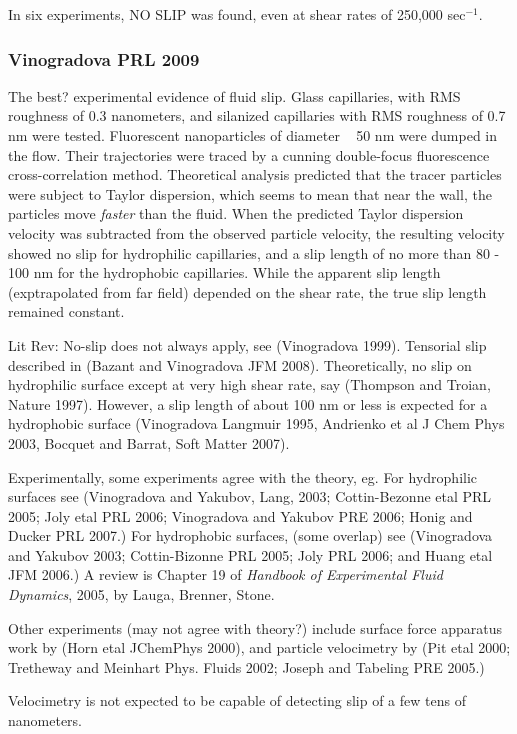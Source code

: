 \documentclass[twocolumn]{article}
\begin{document}
In six experiments, NO SLIP was found, even at shear rates of 250,000 sec$^{-1}$.

\subsubsection*{Vinogradova PRL 2009}
The best? experimental evidence of fluid slip.  Glass capillaries, with RMS roughness of 0.3 nanometers, and silanized capillaries with RMS roughness of 0.7 nm were tested. Fluorescent nanoparticles of diameter ~ 50 nm were dumped in the flow. Their trajectories were traced by a cunning double-focus fluorescence cross-correlation method.  Theoretical analysis predicted that the tracer particles were subject to Taylor dispersion, which seems to mean that near the wall, the particles move \emph{faster} than the fluid. When the predicted Taylor dispersion velocity was subtracted from the observed particle velocity, the resulting velocity showed no slip for hydrophilic capillaries, and a slip length of no more than 80 - 100 nm for the hydrophobic capillaries.  While the apparent slip length (exptrapolated from far field) depended on the shear rate, the true slip length remained constant.

Lit Rev: No-slip does not always apply, see (Vinogradova 1999). Tensorial slip described in (Bazant and Vinogradova JFM 2008). 
Theoretically, no slip on hydrophilic surface except at very high shear rate, say (Thompson and Troian, Nature 1997). However, a slip length of about 100 nm or less is expected for a hydrophobic surface (Vinogradova Langmuir 1995, Andrienko et al J Chem Phys 2003, Bocquet and Barrat, Soft Matter 2007). 

Experimentally, some experiments agree with the theory, eg. For hydrophilic surfaces see (Vinogradova and Yakubov, Lang, 2003; Cottin-Bezonne etal PRL 2005; Joly etal PRL 2006; Vinogradova and Yakubov PRE 2006; Honig and Ducker PRL 2007.)
For hydrophobic surfaces, (some overlap) see (Vinogradova and Yakubov 2003; Cottin-Bizonne PRL 2005; Joly PRL 2006; and Huang etal JFM 2006.)
A review is Chapter 19 of \emph{Handbook of Experimental Fluid Dynamics}, 2005, by Lauga, Brenner, Stone.

Other experiments (may not agree with theory?) include surface force apparatus work by (Horn etal JChemPhys 2000), and particle velocimetry by (Pit etal 2000; Tretheway and Meinhart Phys. Fluids 2002; Joseph and Tabeling PRE 2005.)

Velocimetry is not expected to be capable of detecting slip of a few tens of nanometers.
\end{document}
